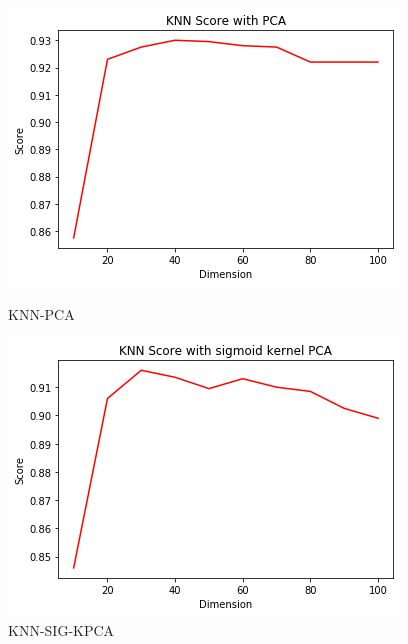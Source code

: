 \documentclass[12pt]{article}
\begin{document}
\begin{figure}[htpb]
	\centering
	\begin{minipage}{.3\textwidth}
		\centering
		\includegraphics[width=\linewidth]{./exp-figs/KNN-PCA.png}
		\caption{KNN-PCA}
		\label{fig:KNN-PCA}
	\end{minipage}%
	\begin{minipage}{0.3\textwidth}
		\centering
		\includegraphics[width=\linewidth]{./exp-figs/KNN-SIG-KPCA.png}
		\caption{KNN-SIG-KPCA}
		\label{fig:KNN-SIG-KPCA}
	\end{minipage}
	\begin{minipage}{0.3\textwidth}
		\centering

\end{minipage}
\end{figure}
\end{document}
